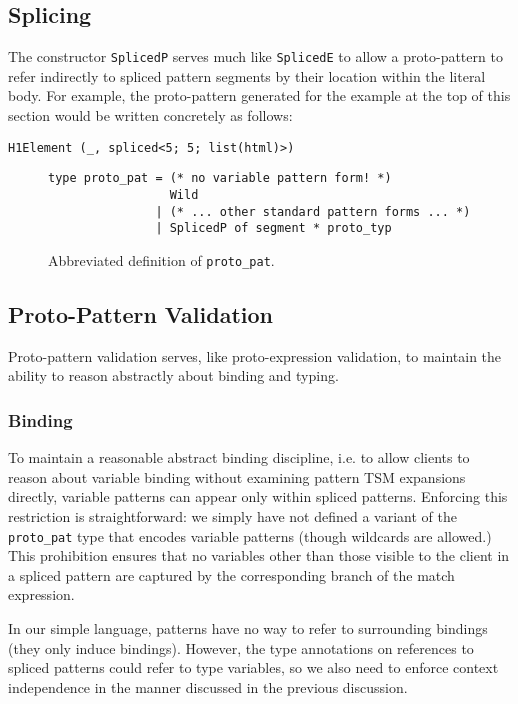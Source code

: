 \documentclass[acmlarge,review,anonymous]{acmart}\settopmatter{printfolios=true}
\newcommand{\li}[1]{\lstinline{#1}}
\begin{document}
\subsection{Splicing}
The constructor \li{SplicedP} serves much like \li{SplicedE} to allow a proto-pattern to refer indirectly to spliced pattern segments by their location within the literal body. For example, the proto-pattern generated for the example at the top of this section would be written concretely as follows:
\begin{lstlisting}[numbers=none]
  H1Element (_, spliced<5; 5; list(html)>)
\end{lstlisting}

\begin{figure}
\begin{lstlisting}[numbers=none]
type proto_pat = (* no variable pattern form! *) 
                 Wild
               | (* ... other standard pattern forms ... *)
               | SplicedP of segment * proto_typ
\end{lstlisting}
\vspace{-5px}
\caption[Abbreviated definition of \li{proto_pat} in VerseML]{Abbreviated definition of \li{proto_pat}.}
\label{fig:CEPat}
\end{figure}

\subsection{Proto-Pattern Validation}
Proto-pattern validation serves, like proto-expression validation, to maintain the ability to reason abstractly about binding and typing. 

\subsubsection{Binding} To maintain a reasonable abstract binding discipline, i.e. to allow clients to reason about variable binding without examining pattern TSM expansions directly, variable patterns can appear only within spliced patterns. Enforcing this restriction is straightforward: we simply have not defined a variant of the \li{proto_pat} type that encodes variable patterns (though wildcards are allowed.)  This prohibition ensures that no variables other than those visible to the client in a spliced pattern are captured by the corresponding branch of the match expression.

In our simple language, patterns have no way to refer to surrounding bindings (they only induce bindings). However, the type annotations on references to spliced patterns could refer to type variables, so we also need to enforce context independence in the manner discussed in the previous discussion.
\end{document}
